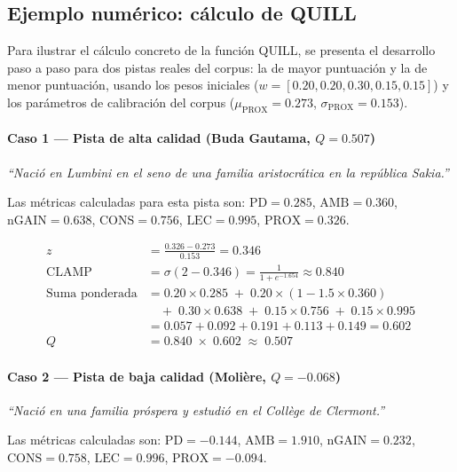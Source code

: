 \documentclass[../main.tex]{subfiles}
\begin{document}
\subsection{Ejemplo numérico: cálculo de QUILL}

Para ilustrar el cálculo concreto de la función QUILL, se presenta el desarrollo paso a paso para dos pistas reales del corpus: la de mayor puntuación y la de menor puntuación, usando los pesos iniciales ($w = [0.20, 0.20, 0.30, 0.15, 0.15]$) y los parámetros de calibración del corpus ($\mu_{\text{PROX}} = 0.273$, $\sigma_{\text{PROX}} = 0.153$).

\paragraph{Caso 1 — Pista de alta calidad (Buda Gautama, $Q = 0.507$)}

\textit{``Nació en Lumbini en el seno de una familia aristocrática en la república Sakia.''}

Las métricas calculadas para esta pista son: $\text{PD} = 0.285$, $\text{AMB} = 0.360$, $\text{nGAIN} = 0.638$, $\text{CONS} = 0.756$, $\text{LEC} = 0.995$, $\text{PROX} = 0.326$.

\begin{align}
z &= \frac{0.326 - 0.273}{0.153} = 0.346 \\[4pt]
\text{CLAMP} &= \sigma(2 - 0.346) = \frac{1}{1 + e^{-1.654}} \approx 0.840 \\[4pt]
\text{Suma ponderada} &= 0.20 \times 0.285 \;+\; 0.20 \times (1 - 1.5 \times 0.360) \nonumber \\
&\quad +\; 0.30 \times 0.638 \;+\; 0.15 \times 0.756 \;+\; 0.15 \times 0.995 \nonumber \\
&= 0.057 + 0.092 + 0.191 + 0.113 + 0.149 = 0.602 \\[4pt]
Q &= 0.840 \;\times\; 0.602 \;\approx\; \mathbf{0.507}
\end{align}

\paragraph{Caso 2 — Pista de baja calidad (Molière, $Q = -0.068$)}

\textit{``Nació en una familia próspera y estudió en el Collège de Clermont.''}

Las métricas calculadas son: $\text{PD} = -0.144$, $\text{AMB} = 1.910$, $\text{nGAIN} = 0.232$, $\text{CONS} = 0.758$, $\text{LEC} = 0.996$, $\text{PROX} = -0.094$.
\end{document}
